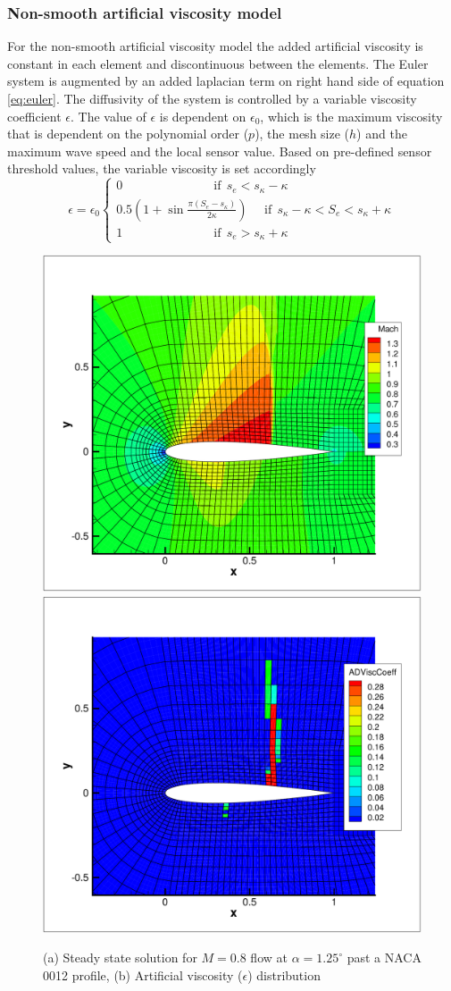 \subsubsection{Non-smooth artificial viscosity model}
For the non-smooth artificial viscosity model the added artificial viscosity is constant in each element and discontinuous between the elements. The Euler system is augmented by an added laplacian term on right hand side of equation \ref{eq:euler}. The diffusivity of the system is controlled by a variable viscosity coefficient $\epsilon$. The value of $\epsilon$ is dependent on $\epsilon_0$, which is the maximum viscosity that is dependent on the polynomial order ($p$), the mesh size ($h$) and the maximum wave speed and the local sensor value. Based on pre-defined sensor threshold values, the variable viscosity is set accordingly
\begin{equation}
   \epsilon
=\epsilon_0\left \{ \begin{array}{l}
    0\	\	\	\	\	\	\	\	\	\	\	\	\	\	\	\	\	\	\	\	\	\	\	\	\	\	\	\	\	\	\	\	\	 \mbox{if}\		\	 s_e<s_\kappa-\kappa\\  
    0.5\left(1+\sin{\frac{\pi\left(S_e-s_\kappa\right)}{2\kappa}}\right)\	\	\	\	\	\	\mbox{if}\		\	 s_\kappa-\kappa<S_e<s_\kappa+\kappa\\
    1\	\	\	\	\	\	\	\	\	\	\	\	\	\	\	\	\	\	\	\	\	\	\	\	\	\	\	\	\	\	\	\	\	 \mbox{if}\		\ s_e > s_\kappa+\kappa
      \end{array} 
    \right.
\end{equation}
\begin{figure}[!htbp]
\begin{center}
\includegraphics[width = 0.47 \textwidth]{img/Mach_P4.pdf}
\includegraphics[width = 0.47 \textwidth]{img/ArtVisc_P4.pdf}
\caption{(a) Steady state solution for $M=0.8$ flow at $\alpha = 1.25^\circ$ past a NACA 0012 profile, (b) Artificial viscosity ($\epsilon$) distribution}
\label{fig:}
\end{center}
\end{figure}
